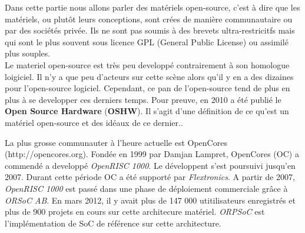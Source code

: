 \vspace{15px}
Dans cette partie nous allons parler des matériels open-source, c'est à dire que les matériels, ou plutôt leurs conceptions, sont crées de manière communautaire ou par des sociétés privée. Ils ne sont pas soumis à des brevets ultra-restricitfs mais qui sont le plus souvent sous licence GPL (General Public License) ou assimilé plus souples. 
\\
Le materiel open-source est très peu developpé contrairement à son homologue loigiciel. Il n'y a que peu d'acteurs sur cette scène alors qu'il y en a des dizaines pour l'open-source logiciel. Cependant, ce pan de l'open-source tend de plus en plus à se developper ces derniers temps. Pour preuve, en 2010 a été publié le \textbf{Open Source Hardware} (\textbf{OSHW}). Il s'agit d'une définition de ce qu'est un matériel open-source et des idéaux de ce dernier..
\\
\par
La plus grosse communauter à l'heure actuelle est OpenCores (http://opencores.org). Fondée en 1999 par Damjan Lampret, OpenCores (OC) a commendé a developpé \textit{OpenRISC 1000}. Le développent s'est poursuivi jusqu'en 2007. Durant cette période OC a été supporté par \textit{Flextronics}. A partir de 2007, \textit{OpenRISC 1000} est passé dans une phase de déploiement commerciale grâce à \textit{ORSoC AB}. En mars 2012, il y avait plus de 147 000 utitilisateurs enregistrés et plus de 900 projets en cours sur cette architecure matériel. \textit{ORPSoC} est l'implémentation de SoC de référence sur cette architecture.
\\
